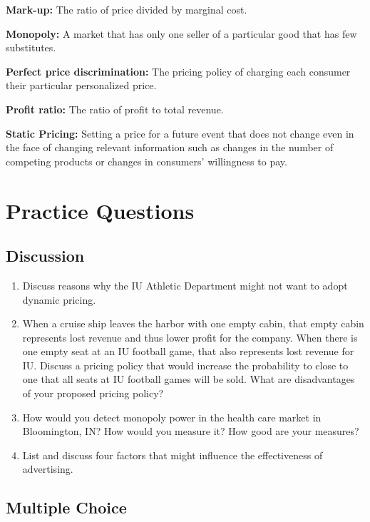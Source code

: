 \documentclass[
]{book}
\providecommand{\tightlist}{%
  \setlength{\itemsep}{0pt}\setlength{\parskip}{0pt}}
\begin{document}
\textbf{Mark-up:} The ratio of price divided by marginal cost.

\textbf{Monopoly:} A market that has only one seller of a particular good that has few substitutes.

\textbf{Perfect price discrimination:} The pricing policy of charging each consumer their particular personalized price.

\textbf{Profit ratio:} The ratio of profit to total revenue.

\textbf{Static Pricing:} Setting a price for a future event that does not change even in the face of changing relevant information such as changes in the number of competing products or changes in consumers' willingness to pay.

\hypertarget{practice-questions-7}{%
\section{Practice Questions}\label{practice-questions-7}}

\hypertarget{discussion-7}{%
\subsection{Discussion}\label{discussion-7}}

\begin{enumerate}
\def\labelenumi{\arabic{enumi}.}
\tightlist
\item
  Discuss reasons why the IU Athletic Department might not want to adopt dynamic pricing.
\item
  When a cruise ship leaves the harbor with one empty cabin, that empty cabin represents lost revenue and thus lower profit for the company. When there is one empty seat at an IU football game, that also represents lost revenue for IU. Discuss a pricing policy that would increase the probability to close to one that all seats at IU football games will be sold. What are disadvantages of your proposed pricing policy?
\item
  How would you detect monopoly power in the health care market in Bloomington, IN? How would you measure it? How good are your measures?
\item
  List and discuss four factors that might influence the effectiveness of advertising.
\end{enumerate}

\hypertarget{multiple-choice-7}{%
\subsection{Multiple Choice}\label{multiple-choice-7}}
\end{document}
